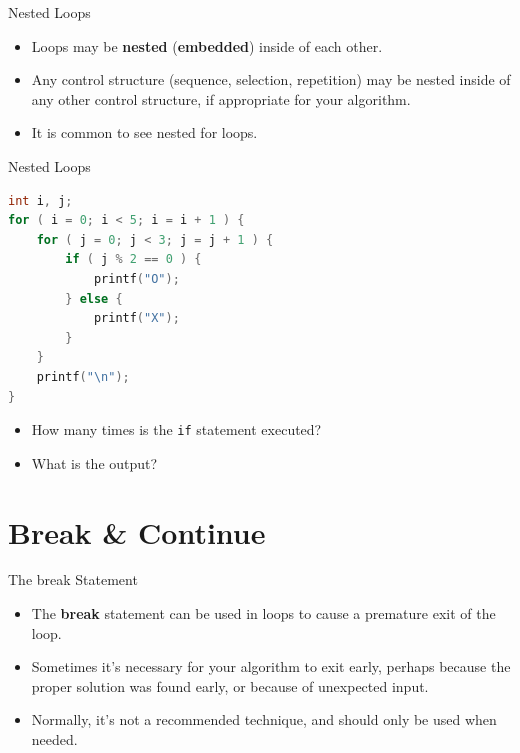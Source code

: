 \documentclass[graphics]{beamer}
\begin{document}
\begin{frame}{Nested Loops}
    \begin{itemize}
        \item Loops may be \textbf{nested} (\textbf{embedded}) inside of each other.
        \item Any control structure (sequence, selection, repetition) may be nested inside of any other control structure, if appropriate for your algorithm.
        \item It is common to see nested for loops.
    \end{itemize}
\end{frame}

\begin{frame}[fragile]{Nested Loops}
    \begin{lstlisting}[language=C,basicstyle=\footnotesize,keywordstyle=\color{blue},commentstyle=\color{green},showstringspaces=false,stringstyle=\color{red}]
int i, j;
for ( i = 0; i < 5; i = i + 1 ) {
    for ( j = 0; j < 3; j = j + 1 ) {
        if ( j % 2 == 0 ) {
            printf("O");
        } else {
            printf("X");
        }
    }
    printf("\n");
}
    \end{lstlisting}
    \begin{itemize}
        \item How many times is the \texttt{if} statement executed?
        \item What is the output?
    \end{itemize}
\end{frame}

\section{Break \& Continue}
\begin{frame}{The break Statement}
    \begin{itemize}
        \item The \textbf{break} statement can be used in loops to cause a premature exit of the loop.
        \item Sometimes it's necessary for your algorithm to exit early, perhaps because the proper solution was found early, or because of unexpected input.
        \item Normally, it's not a recommended technique, and should only be used when needed.
    \end{itemize}
\end{frame}
\end{document}
